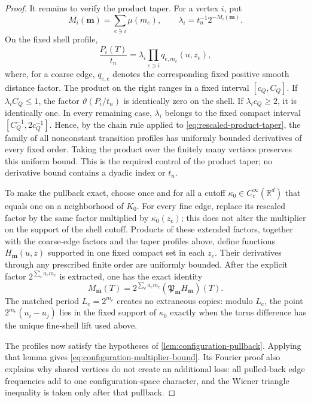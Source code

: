 \documentclass[11pt]{article}
\newcommand{\R}{\mathbb{R}}
\begin{document}
\begin{proof}
It remains to verify the product taper.  For a vertex \(i\), put
\[
 M_i(\bm m)=\sum_{e\ni i}\mu(m_e),
 \qquad
 \lambda_i=t_n^{-1}2^{-M_i(\bm m)}.
\]
On the fixed shell profile,
\begin{equation}
 \frac{P_i(T)}{t_n}
 =\lambda_i
  \prod_{e\ni i}q_{e,m_e}(u,z_e),
 \label{eq:rescaled-product-taper}
\end{equation}
where, for a coarse edge, \(q_{e,\mathrm c}\) denotes the corresponding
fixed positive smooth distance factor.  The product on the right ranges in a
fixed interval \([c_Q,C_Q]\).  If
\(\lambda_iC_Q\le1\), the factor
\(\vartheta(P_i/t_n)\) is identically zero on the shell.  If
\(\lambda_ic_Q\ge2\), it is identically one.  In every remaining case,
\(\lambda_i\) belongs to the fixed compact interval
\([C_Q^{-1},2c_Q^{-1}]\).  Hence, by the chain rule applied to
\eqref{eq:rescaled-product-taper}, the family of all nonconstant transition
profiles has uniformly bounded derivatives of every fixed order.  Taking
the product over the finitely many vertices preserves this uniform bound.
This is the required control of the product taper; no derivative bound
contains a dyadic index or \(t_n\).

To make the pullback exact, choose once and for all a cutoff
\(\kappa_0\in C_c^\infty(\R^d)\) that equals one on a neighborhood of
\(K_0\).  For every fine edge, replace its rescaled factor by the same
factor multiplied by \(\kappa_0(z_e)\); this does not alter the multiplier
on the support of the shell cutoff.  Products of these extended factors,
together with the coarse-edge factors and the taper profiles above, define
functions \(H_{\bm m}(u,z)\) supported in one fixed compact set in each
\(z_e\).  Their derivatives through any prescribed finite order are
uniformly bounded.  After the explicit factor
\(2^{\sum_ea_em_e}\) is extracted, one has the exact identity
\[
 M_{\bm m}(T)
 =2^{\sum_ea_em_e}
   (\mathfrak P_{\bm m}H_{\bm m})(T).
\]
The matched period \(L_e=2^{m_e}\) creates no extraneous copies: modulo
\(L_e\), the point \(2^{m_e}(u_i-u_j)\) lies in the fixed support of
\(\kappa_0\) exactly when the torus difference has the unique fine-shell
lift used above.

The profiles now satisfy the hypotheses of
\cref{lem:configuration-pullback}.  Applying that lemma gives
\eqref{eq:configuration-multiplier-bound}.  Its Fourier proof also explains
why shared vertices do not create an additional loss: all pulled-back edge
frequencies add to one configuration-space character, and the Wiener
triangle inequality is taken only after that pullback.
\end{proof}
\end{document}
